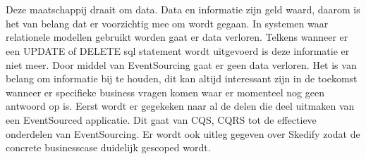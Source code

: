 


\chapter*{}

Deze maatschappij draait om data. Data en informatie zijn geld waard, daarom is het van belang dat er voorzichtig mee om wordt gegaan. In systemen waar relationele modellen gebruikt worden gaat er data verloren. Telkens wanneer er een UPDATE of DELETE sql statement wordt uitgevoerd is deze informatie er niet meer. Door middel van EventSourcing gaat er geen data verloren.
Het is van belang om informatie bij te houden, dit kan altijd interessant zijn in de toekomst wanneer er specifieke business vragen komen waar er momenteel nog geen antwoord op is.
Eerst wordt er gegekeken naar al de delen die deel uitmaken van een EventSourced applicatie. Dit gaat van CQS, CQRS tot de effectieve onderdelen van EventSourcing. Er wordt ook uitleg gegeven over Skedify zodat de concrete businesscase duidelijk gescoped wordt.
